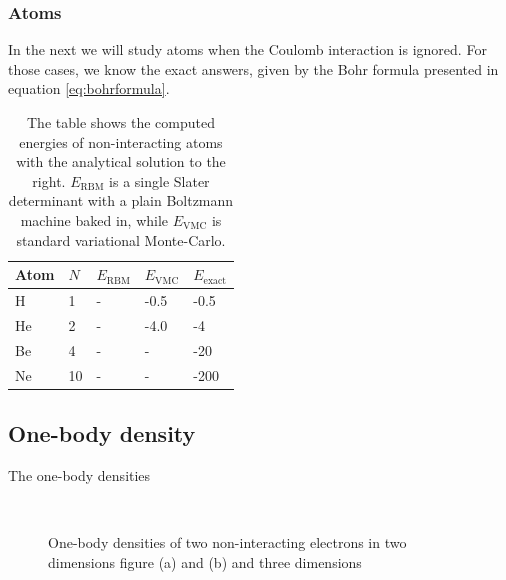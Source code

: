 \subsubsection{Atoms}
In the next we will study atoms when the Coulomb interaction is ignored. For those cases, we know the exact answers, given by the Bohr formula presented in equation \eqref{eq:bohrformula}.
\begin{table} [H]
	\caption{The table shows the computed energies of non-interacting atoms with the analytical solution to the right. $E_{\text{RBM}}$ is a single Slater determinant with a plain Boltzmann machine baked in, while $E_{\text{VMC}}$ is standard variational Monte-Carlo.}
	\begin{tabularx}{\textwidth}{X|X|X:X:X} \hline\hline
		\label{tab:nointeractionatoms}
		Atom & $N$ & $E_{\text{RBM}}$ & $E_{\text{VMC}}$ & $E_{\text{exact}}$ \\ \hline
		H & 1 & - & -0.5 & -0.5 \\ 
		He & 2 & - & -4.0 & -4 \\
		Be & 4 & - & - & -20 \\
		Ne & 10 & - & - & -200 \\ \hline\hline
	\end{tabularx}
\end{table}


\subsection{One-body density}
The one-body densities 

\begin{figure} [h]%
	\centering
	\\
	
	\caption{One-body densities of two non-interacting electrons in two dimensions figure (a) and (b) and three dimensions}%
	\label{fig:OB_nointeraction}
\end{figure}

